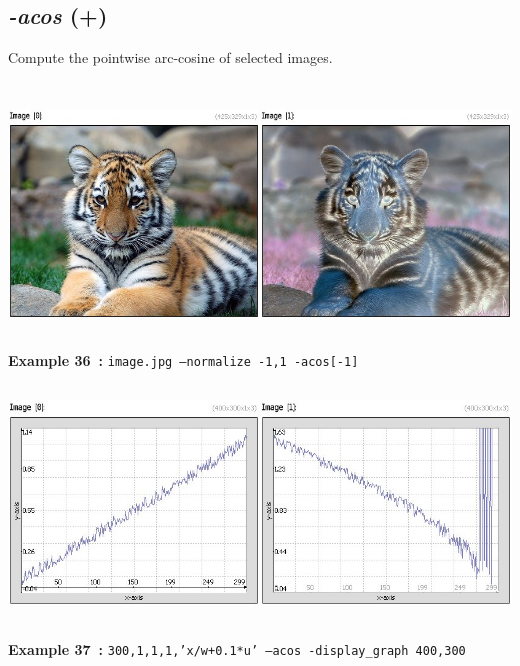 \documentclass[a4paper,11pt,twoside]{book}
\begin{document}
\subsection{\emph{-acos} (+)}\vspace*{-0.5em}
Compute the pointwise arc-cosine of selected images.
\begin{center}\includegraphics[keepaspectratio=true,height=7cm,width=\textwidth]{img/gmic_def36.jpg}\\
{\footnotesize \textbf{Example 36~:} \texttt{image.jpg --normalize -1,1 -acos[-1]}}
\\\includegraphics[keepaspectratio=true,height=7cm,width=\textwidth]{img/gmic_def37.jpg}\\
{\footnotesize \textbf{Example 37~:} \texttt{300,1,1,1,'x/w+0.1*u' --acos -display\_graph 400,300}}
\end{center}
\end{document}
